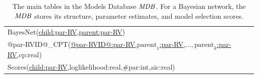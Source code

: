 %
\begin{table}[tbp]
\caption{The main tables in the Models Database $\it{MDB }$. For a Bayesian network, the $\it{MDB }$ stores its structure, parameter estimates, and model selection scores.}
 \centering
 \begin{tabular}
[c]{|l|}\hline
BayesNet(\underline{child:par-RV,parent:par-RV})\\
@par-RVID@\_CPT(\underline{@par-RVID@:par-RV,$\mbox{parent}_{1}$:par-RV,$\ldots,\mbox{parent}_{k}$:par-RV},cp:real)\\ 
Scores(\underline{child:par-RV},loglikelihood:real,\#par:int,aic:real)\\
\hline
\end{tabular}
\label{table:mdb-schema}
\end{table}



%
%

